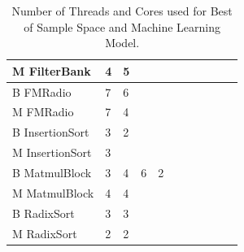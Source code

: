 \begin{table}[!htb]
\begin{tabular} { | l | l | l | l | l | l | l | l | l | l |l| }
    M FilterBank & 4 & 5 & \cellcolor[gray]{0.3} & \cellcolor[gray]{0.3}& \cellcolor[gray]{0.3}& \cellcolor[gray]{0.3}& \cellcolor[gray]{0.3}& \cellcolor[gray]{0.3}& \cellcolor[gray]{0.3}& \cellcolor[gray]{0.3} \\ \hline\hline
    B FMRadio & 7 & 6 & \cellcolor[gray]{0.3}& \cellcolor[gray]{0.3}& \cellcolor[gray]{0.3}& \cellcolor[gray]{0.3}& \cellcolor[gray]{0.3}& \cellcolor[gray]{0.3}& \cellcolor[gray]{0.3}& \cellcolor[gray]{0.3}\\ \hline
    M FMRadio & 7 & 4 & \cellcolor[gray]{0.3} & \cellcolor[gray]{0.3}& \cellcolor[gray]{0.3}& \cellcolor[gray]{0.3}& \cellcolor[gray]{0.3}& \cellcolor[gray]{0.3}& \cellcolor[gray]{0.3}& \cellcolor[gray]{0.3} \\ \hline\hline
    B InsertionSort & 3 & 2& \cellcolor[gray]{0.3}& \cellcolor[gray]{0.3}& \cellcolor[gray]{0.3}& \cellcolor[gray]{0.3}& \cellcolor[gray]{0.3}& \cellcolor[gray]{0.3}& \cellcolor[gray]{0.3}& \cellcolor[gray]{0.3} \\ \hline
    M InsertionSort & 3 & \cellcolor[gray]{0.3}& \cellcolor[gray]{0.3}& \cellcolor[gray]{0.3}& \cellcolor[gray]{0.3}& \cellcolor[gray]{0.3}& \cellcolor[gray]{0.3}& \cellcolor[gray]{0.3}& \cellcolor[gray]{0.3}& \cellcolor[gray]{0.3} \\ \hline\hline
    B MatmulBlock & 3 & 4 & 6 & 2 & \cellcolor[gray]{0.3} & \cellcolor[gray]{0.3} & \cellcolor[gray]{0.3} & \cellcolor[gray]{0.3} & \cellcolor[gray]{0.3} & \cellcolor[gray]{0.3} \\ \hline
    M MatmulBlock & 4 & 4 & \cellcolor[gray]{0.3}& \cellcolor[gray]{0.3}& \cellcolor[gray]{0.3}& \cellcolor[gray]{0.3}& \cellcolor[gray]{0.3}& \cellcolor[gray]{0.3}& \cellcolor[gray]{0.3}& \cellcolor[gray]{0.3} \\ \hline\hline
    B RadixSort & 3 & 3& \cellcolor[gray]{0.3}& \cellcolor[gray]{0.3}& \cellcolor[gray]{0.3}& \cellcolor[gray]{0.3}& \cellcolor[gray]{0.3}& \cellcolor[gray]{0.3}& \cellcolor[gray]{0.3}& \cellcolor[gray]{0.3} \\ \hline
    M RadixSort & 2 & 2& \cellcolor[gray]{0.3}& \cellcolor[gray]{0.3}& \cellcolor[gray]{0.3}& \cellcolor[gray]{0.3}& \cellcolor[gray]{0.3}& \cellcolor[gray]{0.3}& \cellcolor[gray]{0.3}& \cellcolor[gray]{0.3} \\ \hline
    
 \end{tabular}
  \caption{Number of Threads and Cores used for Best of Sample Space and Machine Learning Model.}\label{tab:summary}
\end{table}
